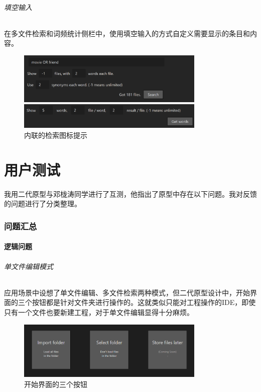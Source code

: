 \documentclass[scheme = chinese]{ctexart}
\begin{document}
\paragraph{填空输入}
在多文件检索和词频统计侧栏中，使用填空输入的方式自定义需要显示的条目和内容。

\begin{figure}[h]
    \centering
    \includegraphics[width=0.8\textwidth]{images/细节-填空输入.png}
    \caption{内联的检索图标提示}
\end{figure}

\clearpage

\part{用户测试}

我用二代原型与邓栊涛同学进行了互测，他指出了原型中存在以下问题。我对反馈的问题进行了分类整理。

\section{问题汇总}

\subsection{逻辑问题}
\paragraph{单文件编辑模式}
应用场景中设想了单文件编辑、多文件检索两种模式，但二代原型设计中，开始界面的三个按钮都是针对文件夹进行操作的。这就类似只能对工程操作的IDE，即使只有一个文件也要新建工程，对于单文件编辑显得十分麻烦。

\begin{figure}[h]
    \centering
    \includegraphics[width=0.8\textwidth]{images/问题-单文件编辑.png}
    \caption{开始界面的三个按钮}
\end{figure}
\end{document}

